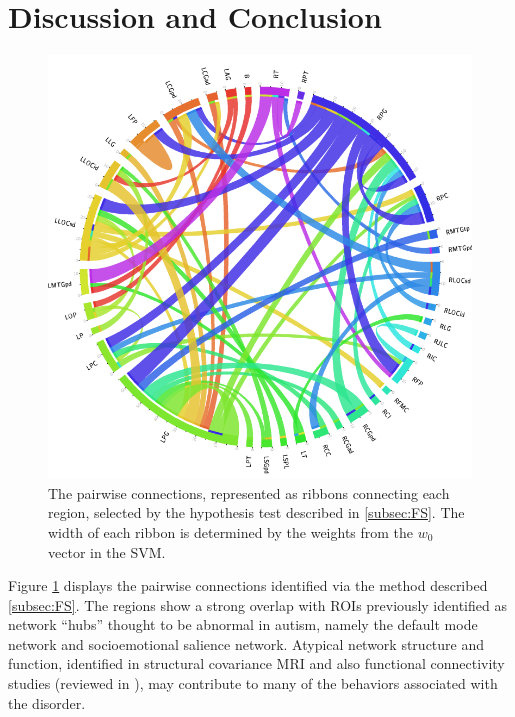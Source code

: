 \documentclass{llncs}
\begin{document}
\section{Discussion and Conclusion}
\begin{figure}
	\centering
	\includegraphics[scale = .3]{now_circos.png}
	\caption{The pairwise connections, represented as ribbons connecting each region, selected by the hypothesis test described in \ref{subsec:FS}.  The width of each ribbon is determined by the weights from the $w_0$ vector in the SVM. }
	\label{fig:circos}
\end{figure}

Figure \ref{fig:circos} displays the pairwise connections identified via the method described \ref{subsec:FS}.  The regions show a strong overlap with ROIs previously identified as network “hubs” thought to be abnormal in autism, namely the default mode network and socioemotional salience network.  Atypical network structure and function, identified in structural covariance MRI \cite{zielinski2012scmri} and also functional connectivity studies (reviewed in \cite{jeff2014}), may contribute to many of the behaviors associated with the disorder.



{}

\end{document}
